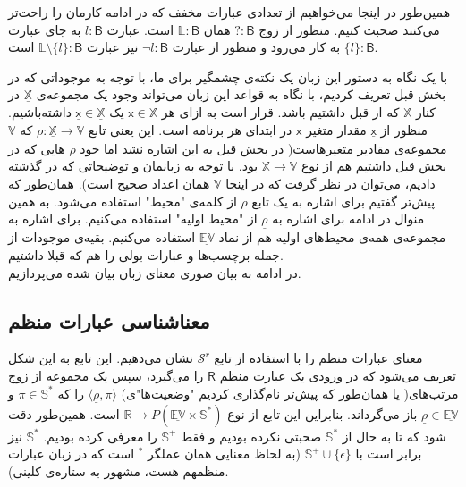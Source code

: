 همین‌طور در اینجا می‌خواهیم از تعدادی عبارات مخفف که در ادامه کارمان را راحت‌تر می‌کنند صحبت کنیم. منظور از زوج 
$\mathsf{? : B}$
همان 
$\mathbb{L}\mathsf{ : B}$
است. عبارت 
$l : \mathsf{B}$
به جای عبارت 
$\{l\} : \mathsf{B}$
به کار می‌رود و منظور از عبارت 
$\neg l \mathsf{: B}$
نیز عبارت 
$\mathbb{L}\setminus\{l\}:\mathsf{B}$
است.

با یک نگاه به دستور این زبان یک نکته‌ی چشمگیر برای ما، با توجه به موجوداتی که در بخش قبل تعریف کردیم، با نگاه به قواعد این زبان می‌تواند وجود یک مجموعه‌ی
$\mathbb{\underline{X}}$
در کنار 
$\mathbb{X}$
که از قبل داشتیم باشد. قرار است به ازای هر 
$\mathsf{x}\in\mathbb{X}$
یک 
$\mathsf{\underline{x}}\in\mathbb{\underline{X}}$
داشته‌باشیم. منظور از 
$\mathsf{\underline{x}}$
مقدار متغیر 
$\mathsf{x}$
در ابتدای هر برنامه است. این یعنی تابع
$\underline{\rho}: \mathbb{\underline{X}} \rightarrow \mathbb{V}$
که 
$\mathbb{V}$
مجموعه‌ی مقادیر متغیرهاست( در بخش قبل به این اشاره نشد اما خود
$\rho$
هایی که در بخش قبل داشتیم هم از نوع
$\mathbb{X} \rightarrow \mathbb{V}$
بود. با توجه به زبانمان و توضیحاتی که در گذشته دادیم، می‌توان در نظر گرفت که در اینجا 
$\mathbb{V}$
همان اعداد صحیح است). همان‌طور که پیش‌تر گفتیم برای اشاره به یک تابع
$\rho$
از کلمه‌ی "محیط" استفاده می‌شود. به همین منوال در ادامه برای اشاره‌ به 
$\underline{\rho}$
از "محیط اولیه" استفاده می‌کنیم. برای اشاره به مجموعه‌ی همه‌ی محیط‌های اولیه هم از نماد 
$\underline{\mathbb{EV}}$
استفاده می‌کنیم.
بقیه‌ی موجودات از جمله برچسب‌ها و عبارات بولی را هم که قبلا داشتیم.\\
در ادامه به بیان صوری معنای زبان بیان شده می‌پردازیم.\\

\subsection{معناشناسی عبارات منظم}
معنای عبارات منظم را با استفاده از تابع 
$\mathcal{S}^r$
نشان می‌دهیم. این تابع به این شکل تعریف می‌شود که در ورودی یک عبارت منظم 
$\mathsf{R}$
را می‌گیرد، سپس یک مجموعه از زوج مرتب‌های( یا همان‌طور که پیش‌تر نام‌گذاری کردیم "وضعیت‌ها"ی)
$\langle\underline{\rho} , \pi\rangle$
را که 
$\pi \in \mathbb{S^*}$
و 
$\underline{\rho} \in \underline{\mathbb{EV}}$
باز می‌گرداند. بنابراین این تابع از نوع
$\mathbb{R} \rightarrow \mathit{P} (\mathbb{\underline{EV} \times S^*})$
است. همین‌طور دقت شود که تا به حال از 
$\mathbb{S}^*$
صحبتی نکرده بودیم و فقط 
$\mathbb{S}^+$
را معرفی کرده بودیم. 
$\mathbb{S}^*$
نیز برابر است با
$\mathbb{S}^+ \cup \{\epsilon\}$ 
(به لحاظ معنایی همان عملگر
$^*$
است که در زبان عبارات منظمهم هست، مشهور به ستاره‌ی کلینی).

